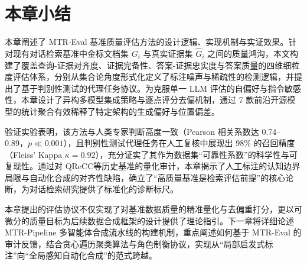 \section{本章小结}



本章阐述了 MTR-Eval 基准质量评估方法的设计逻辑、实现机制与实证效果。针对现有对话检索基准中金标文档集 $G_i$ 与真实证据集 $\hat{G}_i$ 之间的质量鸿沟，本文构建了覆盖查询-证据对齐度、证据完备性、答案-证据忠实度与答案质量的四维细粒度评估体系，分别从集合论角度形式化定义了标注噪声与稀疏性的检测逻辑，并提出了基于判别性测试的代理任务协议。为克服单一 LLM 评估的自偏好与指令敏感性，本章设计了异构多模型集成策略与逐点评分去偏机制，通过 7 款前沿开源模型的统计聚合有效稀释了特定架构的生成偏好与位置偏差。



验证实验表明，该方法与人类专家判断高度一致（Pearson 相关系数达 0.74--0.89，$p \ll 0.001$），且判别性测试代理任务在人工复核中展现出 98\% 的召回精度（Fleiss' Kappa $\kappa = 0.92$），充分证实了其作为数据集“可靠性系数”的科学性与可复现性。通过对 QReCC等历史基准的量化审计，本章揭示了人工标注的认知边界局限与自动化合成的对齐性缺陷，确立了“高质量基准是检索评估前提”的核心论断，为对话检索研究提供了标准化的诊断标尺。



本章提出的评估协议不仅实现了对基准数据质量的精准量化与去偏重打分，更以可微分的质量目标为后续数据合成框架的设计提供了理论指引。下一章将详细论述 MTR-Pipeline 多智能体合成流水线的构建机制，重点阐述如何基于 MTR-Eval 的审计反馈，结合贪心遍历聚类算法与角色制衡协议，实现从“局部启发式标注”向“全局感知自动化合成”的范式跨越。